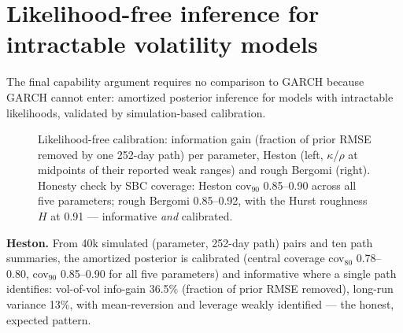 \documentclass[11pt]{article}
\theoremstyle{remark}
\begin{document}
\section{Likelihood-free inference for intractable volatility models}
\label{sec:sbc}

The final capability argument requires no comparison to GARCH because
GARCH cannot enter: amortized posterior inference for models with
intractable likelihoods, validated by simulation-based calibration.

\begin{figure}[t]
\centering
{}\hfill
{}
\caption{Likelihood-free calibration: information gain (fraction of
prior RMSE removed by one 252-day path) per parameter, Heston (left,
$\kappa$/$\rho$ at midpoints of their reported weak ranges) and rough
Bergomi (right). Honesty check by SBC coverage: Heston cov$_{90}$
0.85--0.90 across all five parameters; rough Bergomi 0.85--0.92, with
the Hurst roughness $H$ at 0.91 --- informative \emph{and} calibrated.}
\label{fig:sbc}
\end{figure}

\textbf{Heston.} From 40k simulated (parameter, 252-day path) pairs and
ten path summaries, the amortized posterior is calibrated (central
coverage cov$_{80}$ 0.78--0.80, cov$_{90}$ 0.85--0.90 for all five
parameters) and informative where a single path identifies:
vol-of-vol info-gain 36.5\% (fraction of prior RMSE removed), long-run
variance 13\%, with mean-reversion and leverage weakly identified ---
the honest, expected pattern.
\end{document}

